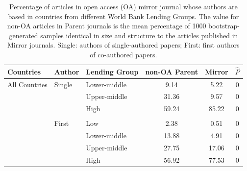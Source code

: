 \documentclass[
  english,
  man]{apa6}
\begin{document}
\begin{table}

\caption{\label{tab:Table5}Percentage of articles in open access (OA) mirror journal whose authors are based in countries from different World Bank Lending Groups. The value for non-OA articles in Parent journals is the mean percentage of 1000 bootstrap-generated samples identical in size and structure to the articles published in Mirror journals. Single: authors of single-authored papers; First: first authors of co-authored papers.}
\centering
\fontsize{12}{14}\selectfont
\begin{tabular}[t]{lllccc}
\toprule
Countries & Author & Lending Group & non-OA Parent & Mirror & $\hat{P}$\\
\midrule
All Countries & Single & Lower-middle & 9.14 & 5.22 & 0\\
 &  & Upper-middle & 31.36 & 9.57 & 0\\
 &  & High & 59.24 & 85.22 & 0\\
 &  &  &  &  & \\
 & First & Low & 2.38 & 0.51 & 0\\
 &  & Lower-middle & 13.88 & 4.91 & 0\\
 &  & Upper-middle & 27.75 & 17.06 & 0\\
 &  & High & 56.92 & 77.53 & 0\\
\bottomrule
\end{tabular}
\end{table}
\end{document}
